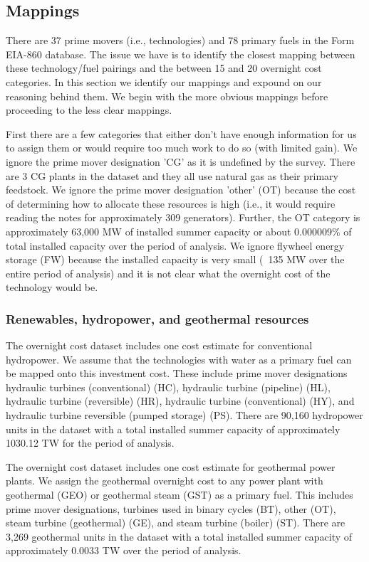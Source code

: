 \documentclass[10pt]{amsart}
\begin{document}
\subsection{Mappings}
There are 37 prime movers (i.e., technologies) and 78 primary fuels in the Form EIA-860 database. 
The issue we have is to identify the closest mapping between these technology/fuel pairings and the between 15 and 20 overnight cost categories.
In this section we identify our mappings and expound on our reasoning behind them.
We begin with the more obvious mappings before proceeding to the less clear mappings.

First there are a few categories that either don't have enough information for us to assign them or would require too much work to do so (with limited gain). 
We ignore the prime mover designation 'CG' as it is undefined by the survey. 
There are 3 CG plants in the dataset and they all use natural gas as their primary feedstock.
We ignore the prime mover designation 'other' (OT) because the cost of determining how to allocate these resources is high (i.e., it would require reading the notes for approximately 309 generators).
Further, the OT category is approximately 63,000 MW of installed summer capacity or about 0.000009\% of total installed capacity over the period of analysis.  
We ignore flywheel energy storage (FW) because the installed capacity is very small (~135 MW over the entire period of analysis) and it is not clear what the overnight cost of the technology would be.  

\subsubsection{Renewables, hydropower, and geothermal resources}

The overnight cost dataset includes one cost estimate for conventional hydropower.
We assume that the technologies with water as a primary fuel can be mapped onto this investment cost.
These include prime mover designations hydraulic turbines (conventional) (HC), hydraulic turbine (pipeline) (HL), hydraulic turbine (reversible) (HR), hydraulic turbine (conventional) (HY), and hydraulic turbine reversible (pumped storage) (PS). 
There are 90,160 hydropower units in the dataset with a total installed summer capacity of approximately 1030.12 TW for the period of analysis. 

The overnight cost dataset includes one cost estimate for geothermal power plants. 
We assign the geothermal overnight cost to any power plant with geothermal (GEO) or geothermal steam (GST) as a primary fuel. 
This includes prime mover designations, turbines used in binary cycles (BT), other (OT), steam turbine (geothermal) (GE), and steam turbine (boiler) (ST).  
There are 3,269 geothermal units in the dataset with a total installed summer capacity of approximately 0.0033 TW over the period of analysis. 
\end{document}
